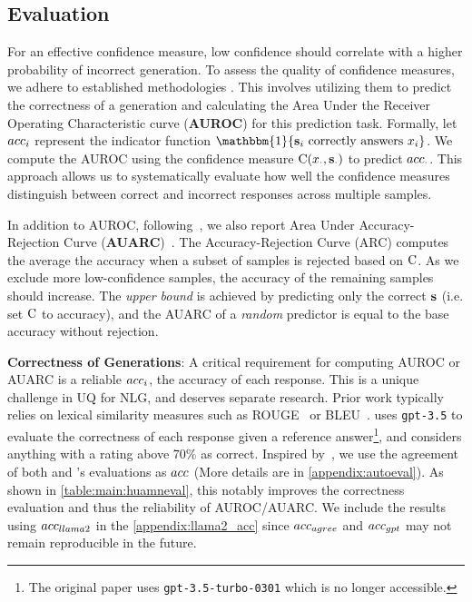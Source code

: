 \subsection{Evaluation}\label{sec:exp:eval}

For an effective confidence measure, low confidence should correlate with a higher probability of incorrect generation.
To assess the quality of confidence measures, we adhere to established methodologies \citep{kuhn2023semantic,Band2022BenchmarkingBD}.
This involves utilizing them to predict the correctness of a generation and calculating the Area Under the Receiver Operating Characteristic curve (\textbf{AUROC}) for this prediction task.
Formally, let $acc_{i}$ represent the indicator function $\mathbbm{1}\{\predSeq_i \text{ correctly answers } x_i\}$. 
We compute the AUROC using the confidence measure $\text{C}(x_\cdot, \mathbf{s}_\cdot)$ to predict $acc_\cdot$. 
This approach allows us to systematically evaluate how well the confidence measures distinguish between correct and incorrect responses across multiple samples.

In addition to AUROC, following~\citet{lin2023generating}, we also report Area Under Accuracy-Rejection Curve (\textbf{AUARC})~\citep{auarc}.
The Accuracy-Rejection Curve (ARC) computes the average the accuracy when a subset of samples is rejected based on $\text{C}$. 
As we exclude more low-confidence samples, the accuracy of the remaining samples should increase. 
The \textit{upper bound} is achieved by predicting only the correct $\mathbf{s}$ (i.e. set $\text{C}$ to accuracy), and the AUARC of a \textit{random} predictor is equal to the base accuracy without rejection.


\textbf{Correctness of Generations}:
A critical requirement for computing AUROC or AUARC is a reliable $acc_{i}$, the accuracy of each response. 
This is a unique challenge in UQ for NLG, and deserves separate research. %
Prior work typically relies on lexical similarity measures such as ROUGE~\citep{kuhn2023semantic,quach2023conformal} or BLEU~\citep{huang2024uncertainty}.
\citet{lin2023generating} uses \texttt{gpt-3.5} to evaluate the correctness of each response given a reference answer\footnote{The original paper uses \texttt{gpt-3.5-turbo-0301} which is no longer accessible.}, and considers anything with a rating above 70\% as correct.
Inspired by~\cite{lin2023generating}, we use the agreement of both \LLaMATwoName and \GPTName's evaluations as $acc$ (More details are in \cref{appendix:autoeval}).
As shown in \cref{table:main:huamneval}, this notably improves the correctness evaluation and thus the reliability of AUROC/AUARC.
We include the results using $acc_{llama2}$ in the \cref{appendix:llama2_acc} since $acc_{agree}$ and $acc_{gpt}$ may not remain reproducible in the future.

